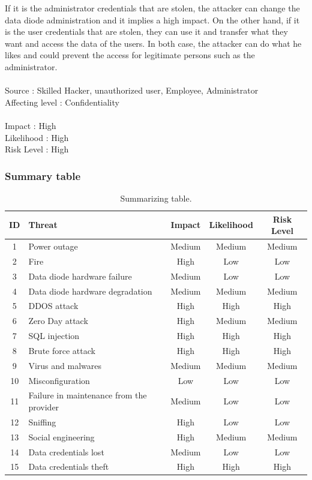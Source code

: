 \documentclass[a4paper,10pt]{article}
\begin{document}
If it is the administrator credentials that are stolen, the attacker can change the data diode administration and it implies a high impact. On the other hand, if it is the user credentials that are stolen, they can use it and transfer what they want and access the data of the users. In both case, the attacker can do what he likes and could prevent the access for legitimate persons such as the administrator. \\ \\ 
Source : Skilled Hacker, unauthorized user, Employee, Administrator \\
Affecting level : Confidentiality \\ \\
Impact : High \\
Likelihood : High \\
Risk Level : High


 \subsubsection{Summary table}
\begin{table}[!h]
	\centering
\begin{tabular}{|c|p{4cm}|c|c|c|}
	\hline
	\textbf{ID}& \textbf{Threat}  & \textbf{Impact} & \textbf{Likelihood} & \textbf{Risk Level}          \\
	\hline
	1 & Power outage & Medium & Medium & Medium \\
	\hline
	2 & Fire  & High & Low & Low \\
	\hline
	3 & Data diode hardware failure & Medium & Low & Low \\
	\hline
	4 & Data diode hardware degradation & Medium & Medium & Medium  \\
	\hline
	5 & DDOS attack & High & High & High \\
	\hline
	6 & Zero Day attack & High & Medium & Medium \\
	\hline
	7 &  SQL injection & High & High & High \\
	\hline
	8 & Brute force attack & High & High & High\\
	\hline
	9 & Virus and malwares & Medium & Medium & Medium \\
	\hline
	10 & Misconfiguration & Low & Low & Low \\
	\hline
	11 & Failure in maintenance from the provider & Medium & Low & Low\\
	\hline
	12 & Sniffing & High & Low & Low \\
	\hline
	13 & Social engineering & High & Medium & Medium \\
	\hline
	14 & Data credentials lost & Medium & Low & Low \\
	\hline
	15 & Data credentials theft & High & High & High \\
	\hline
	\end{tabular}
	\caption{Summarizing table.}
	\label{tab:risklvl}
\end{table}
\end{document}
